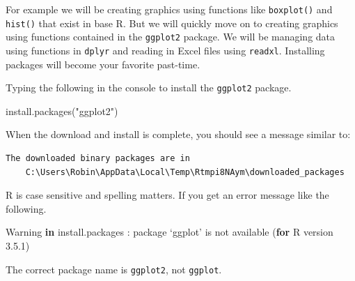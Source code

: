 \documentclass[
  letterpaper,
  DIV=11,
  numbers=noendperiod,
  oneside]{scrreprt}
\newenvironment{Shaded}{\begin{snugshade}}{\end{snugshade}}
\newcommand{\ControlFlowTok}[1]{\textcolor[rgb]{0.00,0.23,0.31}{\textbf{#1}}}
\newcommand{\DecValTok}[1]{\textcolor[rgb]{0.68,0.00,0.00}{#1}}
\newcommand{\FloatTok}[1]{\textcolor[rgb]{0.68,0.00,0.00}{#1}}
\newcommand{\FunctionTok}[1]{\textcolor[rgb]{0.28,0.35,0.67}{#1}}
\newcommand{\NormalTok}[1]{\textcolor[rgb]{0.00,0.23,0.31}{#1}}
\newcommand{\SpecialCharTok}[1]{\textcolor[rgb]{0.37,0.37,0.37}{#1}}
\newcommand{\StringTok}[1]{\textcolor[rgb]{0.13,0.47,0.30}{#1}}
\begin{document}
For example we will be creating graphics using functions like
\texttt{boxplot()} and \texttt{hist()} that exist in base R. But we will
quickly move on to creating graphics using functions contained in the
\texttt{ggplot2} package. We will be managing data using functions in
\texttt{dplyr} and reading in Excel files using \texttt{readxl}.
Installing packages will become your favorite past-time.

\begin{tcolorbox}[enhanced jigsaw, bottomrule=.15mm, colback=white, colframe=quarto-callout-tip-color-frame, toprule=.15mm, coltitle=black, rightrule=.15mm, opacitybacktitle=0.6, colbacktitle=quarto-callout-tip-color!10!white, toptitle=1mm, leftrule=.75mm, breakable, bottomtitle=1mm, titlerule=0mm, title={👉 Install \texttt{ggplot2}}, arc=.35mm, left=2mm, opacityback=0]

Typing the following in the console to install the \texttt{ggplot2}
package.

\begin{Shaded}
\begin{Highlighting}[]
\FunctionTok{install.packages}\NormalTok{(}\StringTok{"ggplot2"}\NormalTok{)}
\end{Highlighting}
\end{Shaded}

\end{tcolorbox}

When the download and install is complete, you should see a message
similar to:

\begin{verbatim}
The downloaded binary packages are in
    C:\Users\Robin\AppData\Local\Temp\Rtmpi8NAym\downloaded_packages
\end{verbatim}

\begin{tcolorbox}[enhanced jigsaw, bottomrule=.15mm, colback=white, colframe=quarto-callout-important-color-frame, toprule=.15mm, coltitle=black, rightrule=.15mm, opacitybacktitle=0.6, colbacktitle=quarto-callout-important-color!10!white, toptitle=1mm, leftrule=.75mm, breakable, bottomtitle=1mm, titlerule=0mm, title=\textcolor{quarto-callout-important-color}{\faExclamation}\hspace{0.5em}{R is Case sensitive}, arc=.35mm, left=2mm, opacityback=0]

R is case sensitive and spelling matters. If you get an error message
like the following.

\begin{Shaded}
\begin{Highlighting}[]
\NormalTok{Warning }\ControlFlowTok{in}\NormalTok{ install.packages }\SpecialCharTok{:}
\NormalTok{  package ‘ggplot’ is not }\FunctionTok{available}\NormalTok{ (}\ControlFlowTok{for}\NormalTok{ R version }\DecValTok{3}\NormalTok{.}\FloatTok{5.1}\NormalTok{)}
\end{Highlighting}
\end{Shaded}

The correct package name is \texttt{ggplot2}, not \texttt{ggplot}.

\end{tcolorbox}
\end{document}
